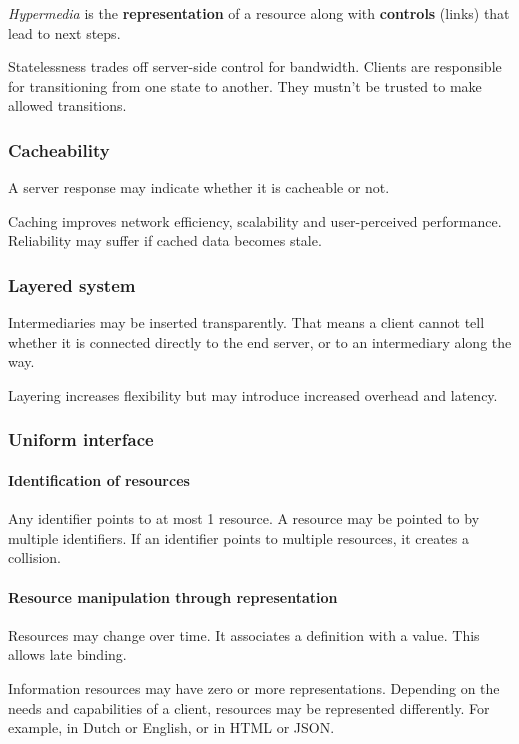 \documentclass{report}
\begin{document}
\emph{Hypermedia} is the \textbf{representation} of a resource
along with \textbf{controls} (links) that lead to next steps.

Statelessness trades off server-side control for bandwidth.
Clients are responsible for transitioning from one state to another.
They mustn't be trusted to make allowed transitions.

\subsubsection{Cacheability}

A server response may indicate whether it is cacheable or not.

Caching improves network efficiency, scalability
and user-perceived performance.
Reliability may suffer if cached data becomes stale.

\subsubsection{Layered system}

Intermediaries may be inserted transparently.
That means a client cannot tell whether it is connected
directly to the end server, or to an intermediary along the way.

Layering increases flexibility
but may introduce increased overhead and latency.

\subsubsection{Uniform interface}

\paragraph{Identification of resources}

Any identifier points to at most 1 resource.
A resource may be pointed to by multiple identifiers.
If an identifier points to multiple resources,
it creates a collision.

\paragraph{Resource manipulation through representation}

Resources may change over time.
It associates a definition with a value.
This allows late binding.

Information resources may have zero or more representations.
Depending on the needs and capabilities of a client,
resources may be represented differently.
For example, in Dutch or English, or in HTML or JSON.
\end{document}
